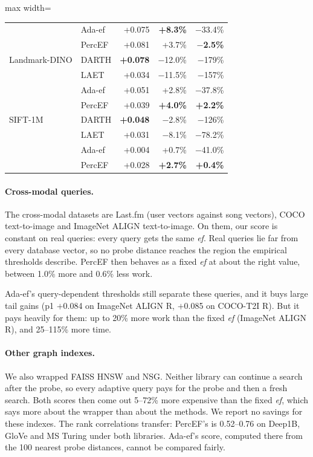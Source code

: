 \documentclass[twocolumn]{svjour3}
\newcommand{\ef}{\textit{ef}}
\begin{document}
\begin{table}[t]
\begin{adjustbox}{max width=\linewidth}
\begin{tabular}{llrrr}
                  & Ada-ef & +0.075 & \textbf{+8.3\%} & $-$33.4\% \\
                  & PercEF & +0.081 & +3.7\% & \textbf{$-$2.5\%} \\
    \midrule
    Landmark-DINO & DARTH  & \textbf{+0.078} & $-$12.0\% & $-$179\% \\
                  & LAET   & +0.034 & $-$11.5\% & $-$157\% \\
                  & Ada-ef & +0.051 & +2.8\% & $-$37.8\% \\
                  & PercEF & +0.039 & \textbf{+4.0\%} & \textbf{+2.2\%} \\
    \midrule
    SIFT-1M       & DARTH  & \textbf{+0.048} & $-$2.8\% & $-$126\% \\
                  & LAET   & +0.031 & $-$8.1\% & $-$78.2\% \\
                  & Ada-ef & +0.004 & +0.7\% & $-$41.0\% \\
                  & PercEF & +0.028 & \textbf{+2.7\%} & \textbf{+0.4\%} \\
    \bottomrule
  \end{tabular}\end{adjustbox}
\end{table}

\paragraph{Cross-modal queries.}
The cross-modal datasets are Last.fm (user vectors against song vectors), COCO text-to-image and
ImageNet ALIGN text-to-image. On them, our score is constant on real queries: every query gets the
same \ef{}. Real queries lie far from every database vector, so no probe distance reaches the region
the empirical thresholds describe. PercEF then behaves as a fixed \ef{} at about the right value,
between 1.0\% more and 0.6\% less work.

Ada-ef's query-dependent thresholds still separate these queries, and it buys large tail gains (p1
$+$0.084 on ImageNet ALIGN R, $+$0.085 on COCO-T2I R). But it pays heavily for them: up to 20\% more
work than the fixed \ef{} (ImageNet ALIGN R), and 25--115\% more time.

\paragraph{Other graph indexes.}
We also wrapped FAISS HNSW and NSG. Neither library can continue a search after the probe, so every
adaptive query pays for the probe and then a fresh search. Both scores then come out 5--72\% more
expensive than the fixed \ef{}, which says more about the wrapper than about the methods. We report
no savings for these indexes. The rank correlations transfer: PercEF's is 0.52--0.76 on Deep1B, GloVe
and MS Turing under both libraries. Ada-ef's score, computed there from the 100 nearest probe
distances, cannot be compared fairly.
\end{document}
